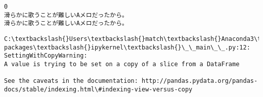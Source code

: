\documentclass[11pt]{article}
\begin{document}
    \begin{Verbatim}[commandchars=\\\{\}]
0
滑らかに歌うことが難しいAメロだったから。
滑らかに歌うことが難しいAメロだったから。

    \end{Verbatim}

    \begin{Verbatim}[commandchars=\\\{\}]
C:\textbackslash{}Users\textbackslash{}match\textbackslash{}Anaconda3\textbackslash{}lib\textbackslash{}site-packages\textbackslash{}ipykernel\textbackslash{}\_\_main\_\_.py:12: SettingWithCopyWarning: 
A value is trying to be set on a copy of a slice from a DataFrame

See the caveats in the documentation: http://pandas.pydata.org/pandas-docs/stable/indexing.html\#indexing-view-versus-copy

    \end{Verbatim}
\end{document}
